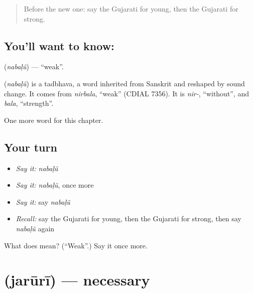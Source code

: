 \label{lesson:GU-C137-nabalu}



\begin{quote}
Before the new one: say the Gujarati for young, then the Gujarati for strong.
\end{quote}

\subsection*{You'll want to know: }
\textbf{} (\emph{nabaḷũ}) — \textquotedblleft{}weak\textquotedblright{}.

\begin{cousinweb}
\textbf{} (\emph{nabaḷũ}) is a tadbhava, a word inherited from Sanskrit and reshaped by sound change. It comes from \emph{nirbala}, \textquotedblleft{}weak\textquotedblright{} (CDIAL 7356). It is \emph{nir-}, \textquotedblleft{}without\textquotedblright{}, and \emph{bala}, \textquotedblleft{}strength\textquotedblright{}.
\end{cousinweb}

\begin{grammarlens}[title={What you've built}]
One more word for this chapter.
\end{grammarlens}

\subsection*{Your turn}
\begin{itemize}
\raggedright
  \item \emph{Say it:} \emph{nabaḷũ}
  \item \emph{Say it:} \emph{nabaḷũ}, once more
  \item \emph{Say it:} say \emph{nabaḷũ}
  \item \emph{Recall:} say the Gujarati for young, then the Gujarati for strong, then say \emph{nabaḷũ} again
\end{itemize}

\begin{tcolorbox}[breakable,colback=teal!4,colframe=teal!35!black,title={Before you move on}]
What does  mean? (\textquotedblleft{}Weak\textquotedblright{}.) Say it once more.
\end{tcolorbox}
\section[\texorpdfstring{\gu{જરૂરી} (jarūrī)}{જરૂરી (jarūrī)}]{ (jarūrī) — necessary}

